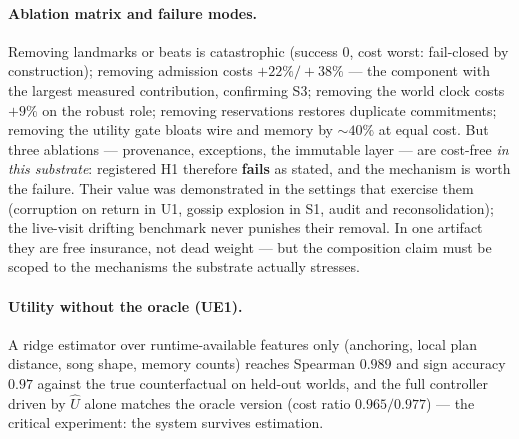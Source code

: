 \documentclass{article}
\begin{document}
\paragraph{Ablation matrix and failure modes.} Removing
landmarks or beats is catastrophic (success $0$, cost worst:
fail-closed by construction); removing admission costs $+22\%/+38\%$
--- the component with the largest measured contribution, confirming S3; removing
the world clock costs $+9\%$ on the robust role; removing
reservations restores duplicate commitments; removing the utility
gate bloats wire and memory by ${\sim}40\%$ at equal cost. But three
ablations --- provenance, exceptions, the immutable layer --- are
cost-free \emph{in this substrate}: registered H1 therefore
\textbf{fails} as stated, and the mechanism is worth the failure.
Their value was demonstrated in the settings that exercise them
(corruption on return in U1, gossip explosion in S1, audit and
reconsolidation); the live-visit drifting benchmark never punishes
their removal. In one artifact they are free insurance, not dead
weight --- but the composition claim must be scoped to the mechanisms
the substrate actually stresses.

\paragraph{Utility without the oracle (UE1).} A ridge estimator over
runtime-available features only (anchoring, local plan distance, song
shape, memory counts) reaches Spearman $0.989$ and sign accuracy
$0.97$ against the true counterfactual on held-out worlds, and the
full controller driven by $\widehat U$ alone matches the oracle
version (cost ratio $0.965/0.977$) --- the critical
experiment: the system survives estimation.
\end{document}
